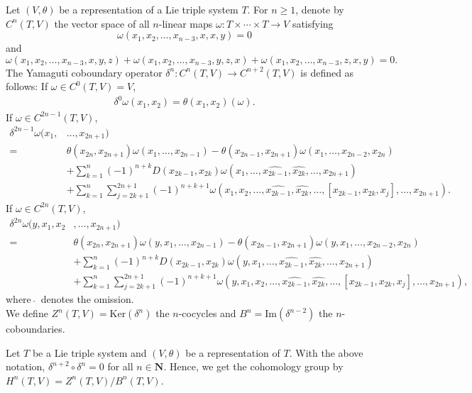 \documentclass[11pt, twoside]{article}
\begin{document}
Let $(V,\theta) $ be a representation of a Lie triple system $T$. For $n\geq 1$, denote by $C^{n}(T,V) $ the vector space of all $n$-linear maps $\omega:T\times \cdots\times T\to V$ satisfying $$\omega(x_1,x_2,\ldots,x_{n-3},x,x,y)=0 $$ and \begin{equation}\label{eqcycl}
    \omega(x_1,x_2,\ldots,x_{n-3},x,y,z)+\omega(x_1,x_2,\ldots,x_{n-3},y,z,x)+\omega(x_1,x_2,\ldots,x_{n-3},z,x,y)=0. 
\end{equation} The Yamaguti coboundary operator $\delta^{n}:C^{n}(T,V)\to C^{n+2}(T,V) $ is defined as follows: If $\omega\in C^0(T,V)=V$,
\begin{align*}
    \delta^0\omega(x_1,x_2)= \theta(x_1,x_2)(\omega).
\end{align*} If $\omega\in C^{2n-1}(T,V) $,
\begin{align*}
    \delta^{2n-1}\omega(x_1,&\ldots,x_{2n+1})\\=& \theta(x_{2n},x_{2n+1})\omega(x_1,\ldots,x_{2n-1}) - \theta(x_{2n-1},x_{2n+1})\omega(x_1,\ldots,x_{2n-2},x_{2n}) \\& + \sum\limits_{k=1}^n(-1)^{n+k}D(x_{2k-1},x_{2k})\omega(x_1,\ldots,\widehat{x_{2k-1}},\widehat{x_{2k}},\ldots,x_{2n+1}) \\ &+ \sum\limits_{k=1}^n\sum\limits_{j=2k+1}^{2n+1}(-1)^{n+k+1}\omega(x_1,x_2,\ldots,\widehat{x_{2k-1}},\widehat{x_{2k}},\ldots,[x_{2k-1},x_{2k},x_j],\ldots,x_{2n+1}).
\end{align*}  If $\omega\in C^{2n}(T,V) $,
 \begin{align*}
    \delta^{2n}\omega(y,x_1,x_2&,\ldots,x_{2n+1})\\ =& \theta(x_{2n},x_{2n+1})\omega(y,x_1,\ldots,x_{2n-1}) - \theta(x_{2n-1},x_{2n+1})\omega(y,x_1,\ldots,x_{2n-2},x_{2n}) \\& + \sum\limits_{k=1}^n(-1)^{n+k}D(x_{2k-1},x_{2k})\omega(y,x_1,\ldots,\widehat{x_{2k-1}},\widehat{x_{2k}},\ldots,x_{2n+1}) \\ &+ \sum\limits_{k=1}^n\sum\limits_{j=2k+1}^{2n+1}(-1)^{n+k+1}\omega(y,x_1,x_2,\ldots,\widehat{x_{2k-1}},\widehat{x_{2k}},\ldots,[x_{2k-1},x_{2k},x_j],\ldots,x_{2n+1}),
\end{align*}  where $\,\hat{}\,$ denotes the omission. \\ We define $Z^{n}(T,V)= \mathrm{Ker}(\delta^{n}) $ the $n$-cocycles and $B^{n}=\mathrm{Im}(\delta^{n-2}) $ the $n$-coboundaries.

\begin{thm}\cite{Y60}
    Let $T$ be a Lie triple system and $(V,\theta) $ be a representation of $T$. With the above notation, $\delta^{n+2}\circ \delta^{n} =0$ for all $n\in \mathbf{N}$. Hence, we get the cohomology group by $H^{n}(T,V)= Z^{n}(T,V)/B^{n}(T,V) $.
\end{thm}
\end{document}

